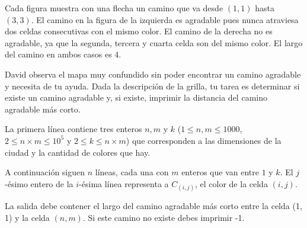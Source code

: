 \documentclass{oci}
\begin{document}
\begin{problemDescription}
\begin{figure}[!h]
\end{figure}

Cada figura muestra con una flecha un camino que va desde $(1,1)$ hasta $(3,3)$.
%
El camino en la figura de la izquierda es agradable pues nunca atraviesa dos celdas
consecutivas con el mismo color.
%
El camino de la derecha no es agradable, ya que la segunda, tercera y cuarta
celda son del mismo color.
%
El largo del camino en ambos casos es $4$.

David observa el mapa muy confundido sin poder encontrar un camino agradable y necesita de tu
ayuda.
%
Dada la descripción de la grilla, tu tarea es determinar si existe un camino agradable
y, si existe, imprimir la distancia del camino agradable más corto.

\end{problemDescription}


\begin{inputDescription}
La primera línea contiene tres enteros $n, m$ y $k$
($1 \leq n, m \leq 1000$, $2 \leq n\times m \leq 10^5$ y $2 \leq k \leq n \times m$)
que corresponden a las dimensiones de la ciudad y la cantidad de colores que hay.

A continuación siguen $n$ líneas, cada una con $m$ enteros que van entre $1$ y $k$.
%
El $j$-ésimo entero de la $i$-ésima línea representa a $C_{(i,j)}$, el color de la celda $(i,j)$.

\end{inputDescription}

\begin{outputDescription}
  La salida debe contener el largo del camino agradable más corto entre la celda (1, 1)
  y la celda $(n, m)$.
  Si este camino no existe debes imprimir -1.

\end{outputDescription}
\end{document}
